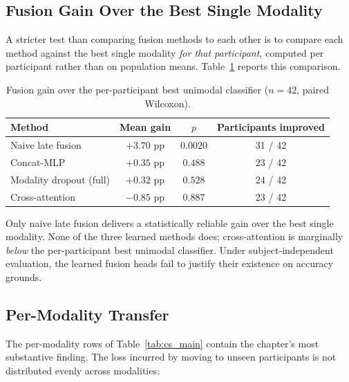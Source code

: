 \subsection{Fusion Gain Over the Best Single Modality}

A stricter test than comparing fusion methods to each other is to compare each method
against the best single modality \emph{for that participant}, computed per
participant rather than on population means. Table~\ref{tab:cs_gain} reports this
comparison.

\begin{table}[htbp]
\centering
\caption{Fusion gain over the per-participant best unimodal classifier
($n = 42$, paired Wilcoxon).}
\label{tab:cs_gain}
\begin{tabular}{lccc}
\hline
\textbf{Method} & \textbf{Mean gain} & \textbf{$p$} & \textbf{Participants improved} \\
\hline
Naive late fusion       & $+3.70$ pp & $0.0020$ & 31 / 42 \\
Concat-MLP              & $+0.35$ pp & $0.488$   & 23 / 42 \\
Modality dropout (full) & $+0.32$ pp & $0.528$   & 24 / 42 \\
Cross-attention         & $-0.85$ pp & $0.887$   & 23 / 42 \\
\hline
\end{tabular}
\end{table}

Only naive late fusion delivers a statistically reliable gain over the best single
modality. None of the three learned methods does; cross-attention is marginally
\emph{below} the per-participant best unimodal classifier. Under subject-independent
evaluation, the learned fusion heads fail to justify their existence on accuracy
grounds.

\subsection{Per-Modality Transfer}
\label{sec:cs_permodality}

The per-modality rows of Table~\ref{tab:cs_main} contain the chapter's most
substantive finding. The loss incurred by moving to unseen participants is not
distributed evenly across modalities:

